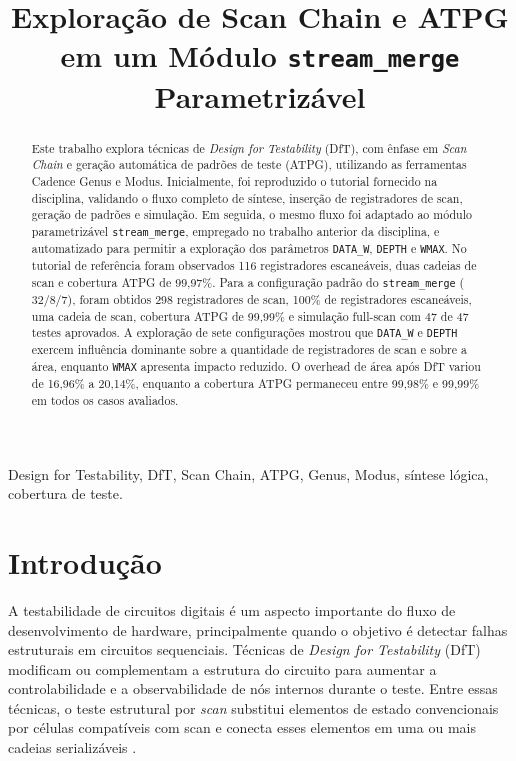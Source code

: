 \documentclass[conference]{IEEEtran}
\title{Exploração de Scan Chain e ATPG em um Módulo \texttt{stream\_merge} Parametrizável}
\author{
\IEEEauthorblockN{Pedro Henrique de Ros, Douglas Cavalheiro Carvalho e Matheus Susin Timmers}
\IEEEauthorblockA{
98G10-04 -- Confiabilidade e Segurança de Hardware\\
Pontifícia Universidade Católica do Rio Grande do Sul -- PUCRS\\
Professor: Anderson Domingues
}
}
\begin{document}
\maketitle

\begin{abstract}
Este trabalho explora técnicas de \textit{Design for Testability} (DfT), com ênfase em \textit{Scan Chain} e geração automática de padrões de teste (ATPG), utilizando as ferramentas Cadence Genus e Modus. Inicialmente, foi reproduzido o tutorial fornecido na disciplina, validando o fluxo completo de síntese, inserção de registradores de scan, geração de padrões e simulação. Em seguida, o mesmo fluxo foi adaptado ao módulo parametrizável \texttt{stream\_merge}, empregado no trabalho anterior da disciplina, e automatizado para permitir a exploração dos parâmetros \texttt{DATA\_W}, \texttt{DEPTH} e \texttt{WMAX}. No tutorial de referência foram observados 116 registradores escaneáveis, duas cadeias de scan e cobertura ATPG de 99,97\%. Para a configuração padrão do \texttt{stream\_merge} ($32/8/7$), foram obtidos 298 registradores de scan, 100\% de registradores escaneáveis, uma cadeia de scan, cobertura ATPG de 99,99\% e simulação full-scan com 47 de 47 testes aprovados. A exploração de sete configurações mostrou que \texttt{DATA\_W} e \texttt{DEPTH} exercem influência dominante sobre a quantidade de registradores de scan e sobre a área, enquanto \texttt{WMAX} apresenta impacto reduzido. O overhead de área após DfT variou de 16,96\% a 20,14\%, enquanto a cobertura ATPG permaneceu entre 99,98\% e 99,99\% em todos os casos avaliados.
\end{abstract}

\begin{IEEEkeywords}
Design for Testability, DfT, Scan Chain, ATPG, Genus, Modus, síntese lógica, cobertura de teste.
\end{IEEEkeywords}

\section{Introdução}
A testabilidade de circuitos digitais é um aspecto importante do fluxo de desenvolvimento de hardware, principalmente quando o objetivo é detectar falhas estruturais em circuitos sequenciais. Técnicas de \textit{Design for Testability} (DfT) modificam ou complementam a estrutura do circuito para aumentar a controlabilidade e a observabilidade de nós internos durante o teste. Entre essas técnicas, o teste estrutural por \textit{scan} substitui elementos de estado convencionais por células compatíveis com scan e conecta esses elementos em uma ou mais cadeias serializáveis \cite{ensilica_dft}.
\end{document}
